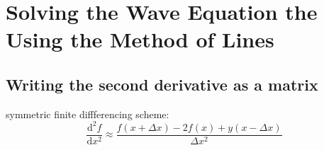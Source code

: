 \section{Solving the Wave Equation the Using the Method of Lines}

\subsection{Writing the second derivative as a matrix}
symmetric finite diffferencing scheme:
\begin{equation}
  \frac{\mathrm{d^2} f}{\mathrm{d}{x^2}} \approx \frac{f(x+\Delta x) - 2f(x) + y(x-\Delta x)}{\Delta x^2}
\end{equation}
